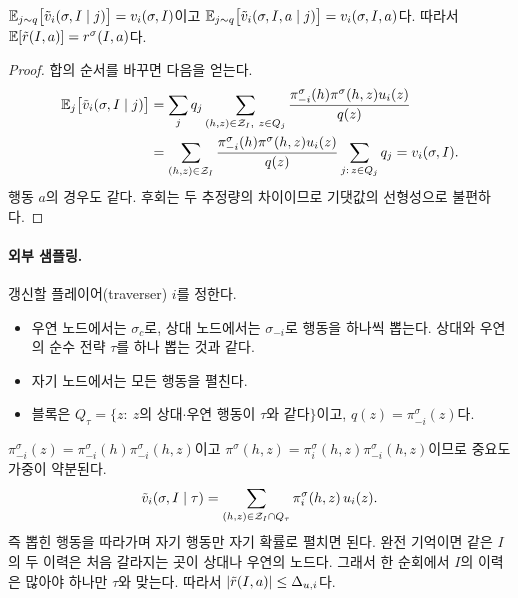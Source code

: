 \begin{lemma}\label{lem:unbiased}
$\mathbb{E}_{j\sim q}\big[\tilde v_i(\sigma,I\mid j)\big]=v_i(\sigma,I)$이고 $\mathbb{E}_{j\sim q}\big[\tilde v_i(\sigma,I,a\mid j)\big]=v_i(\sigma,I,a)$다. 따라서 $\mathbb{E}[\tilde r(I,a)]=r^\sigma(I,a)$다.
\end{lemma}
\begin{proof}
합의 순서를 바꾸면 다음을 얻는다.
\begin{align*}
\mathbb{E}_j\big[\tilde v_i(\sigma,I\mid j)\big]&=\sum_jq_j\sum_{(h,z)\in\mathcal{Z}_I,\ z\in Q_j}\frac{\pi^\sigma_{-i}(h)\pi^\sigma(h,z)u_i(z)}{q(z)}\\
&=\sum_{(h,z)\in\mathcal{Z}_I}\frac{\pi^\sigma_{-i}(h)\pi^\sigma(h,z)u_i(z)}{q(z)}\sum_{j:\,z\in Q_j}q_j=v_i(\sigma,I).
\end{align*}
행동 $a$의 경우도 같다. 후회는 두 추정량의 차이이므로 기댓값의 선형성으로 불편하다.
\end{proof}

\paragraph{외부 샘플링.}
갱신할 플레이어(traverser) $i$를 정한다.
\begin{itemize}
  \item 우연 노드에서는 $\sigma_c$로, 상대 노드에서는 $\sigma_{-i}$로 행동을 하나씩 뽑는다. 상대와 우연의 순수 전략 $\tau$를 하나 뽑는 것과 같다.
  \item 자기 노드에서는 모든 행동을 펼친다.
  \item 블록은 $Q_\tau=\{z:\ z\text{의 상대·우연 행동이 }\tau\text{와 같다}\}$이고, $q(z)=\pi^\sigma_{-i}(z)$다.
\end{itemize}
$\pi^\sigma_{-i}(z)=\pi^\sigma_{-i}(h)\pi^\sigma_{-i}(h,z)$이고 $\pi^\sigma(h,z)=\pi_i^\sigma(h,z)\pi_{-i}^\sigma(h,z)$이므로 중요도 가중이 약분된다.
\[
\tilde v_i(\sigma,I\mid\tau)=\sum_{(h,z)\in\mathcal{Z}_I\cap Q_\tau}\pi_i^\sigma(h,z)\,u_i(z).
\]
즉 뽑힌 행동을 따라가며 자기 행동만 자기 확률로 펼치면 된다.
완전 기억이면 같은 $I$의 두 이력은 처음 갈라지는 곳이 상대나 우연의 노드다. 그래서 한 순회에서 $I$의 이력은 많아야 하나만 $\tau$와 맞는다. 따라서 $\left\lvert \tilde r(I,a)\right\rvert\le\Delta_{u,i}$다.

